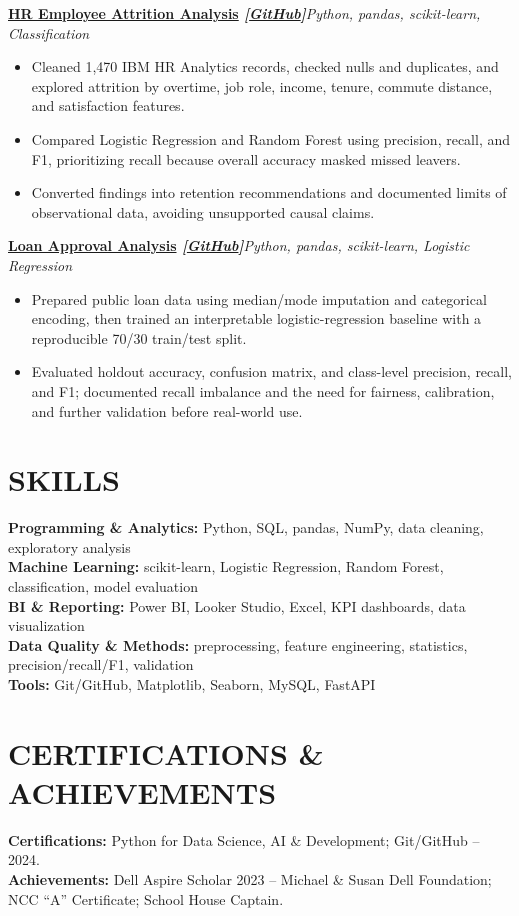 \documentclass[10pt,a4paper]{article}
\newcommand{\resumeProject}[2]{%
  \textbf{#1}\hfill{\small\textit{#2}}\vspace{-3pt}
}
\begin{document}
\resumeProject
  {\href{https://nothing0g.github.io/analyst/projects/hr-employee-attrition/}{HR Employee Attrition Analysis}
  \hspace{3pt}\textnormal{\textit{[\href{https://github.com/Nothing0g/hr_employee_attrition_analysis}{GitHub}]}}}
  {Python, pandas, scikit-learn, Classification}
\begin{itemize}
  \item Cleaned 1,470 IBM HR Analytics records, checked nulls and duplicates, and explored attrition by overtime, job role, income, tenure, commute distance, and satisfaction features.
  \item Compared Logistic Regression and Random Forest using precision, recall, and F1, prioritizing recall because overall accuracy masked missed leavers.
  \item Converted findings into retention recommendations and documented limits of observational data, avoiding unsupported causal claims.
\end{itemize}

\resumeProject
  {\href{https://nothing0g.github.io/analyst/projects/loan-approval/}{Loan Approval Analysis}
  \hspace{3pt}\textnormal{\textit{[\href{https://github.com/Nothing0g/loan-approval-analysis}{GitHub}]}}}
  {Python, pandas, scikit-learn, Logistic Regression}
\begin{itemize}
  \item Prepared public loan data using median/mode imputation and categorical encoding, then trained an interpretable logistic-regression baseline with a reproducible 70/30 train/test split.
  \item Evaluated holdout accuracy, confusion matrix, and class-level precision, recall, and F1; documented recall imbalance and the need for fairness, calibration, and further validation before real-world use.
\end{itemize}

\section*{SKILLS}
\textbf{Programming \& Analytics:} Python, SQL, pandas, NumPy, data cleaning, exploratory analysis\\
\textbf{Machine Learning:} scikit-learn, Logistic Regression, Random Forest, classification, model evaluation\\
\textbf{BI \& Reporting:} Power BI, Looker Studio, Excel, KPI dashboards, data visualization\\
\textbf{Data Quality \& Methods:} preprocessing, feature engineering, statistics, precision/recall/F1, validation\\
\textbf{Tools:} Git/GitHub, Matplotlib, Seaborn, MySQL, FastAPI

\section*{CERTIFICATIONS \& ACHIEVEMENTS}
{\fontsize{9.2pt}{10.2pt}\selectfont
\textbf{Certifications:} Python for Data Science, AI \& Development; Git/GitHub -- 2024.\\[-1pt]
\textbf{Achievements:} Dell Aspire Scholar 2023 -- Michael \& Susan Dell Foundation; NCC ``A'' Certificate; School House Captain.
}
\end{document}
